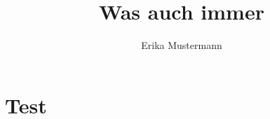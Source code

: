 \documentclass[openany,ngerman]{book}
\author{Erika Mustermann}
\title{Was auch immer}
\begin{document}
\frontmatter

\listofrcodes

\mainmatter
\chapter{Test}

\begin{rcode}
  \caption{Ein R-Code ohne Inhalt}
\end{rcode}
\end{document}
